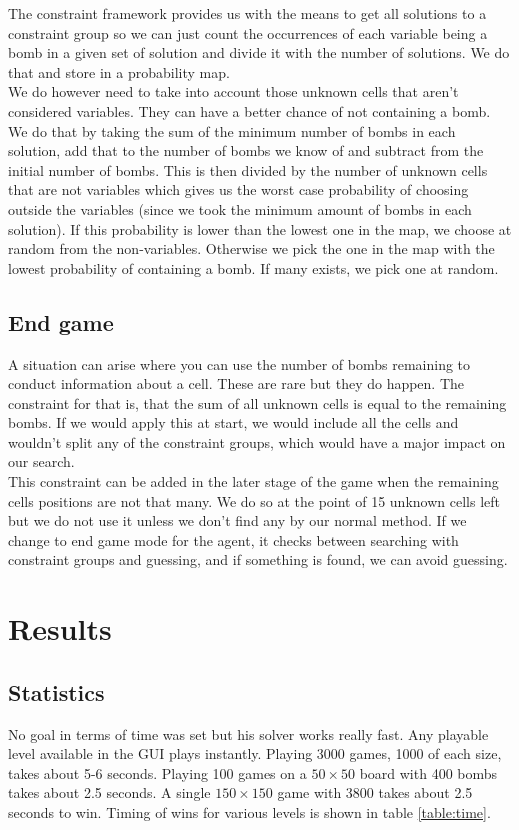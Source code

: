 \documentclass[11pt,a4paper,notitlepage]{article}
\theoremstyle{definition}
\begin{document}
The constraint framework provides us with the means to get all solutions to a constraint group so we can just count the occurrences of each variable being a bomb in a given set of solution and divide it with the number of solutions. We do that and store in a probability map.\\

We do however need to take into account those unknown cells that aren't considered variables. They can have a better chance of not containing a bomb. We do that by taking the sum of the minimum number of bombs in each solution, add that to the number of bombs we know of and subtract from the initial number of bombs. This is then divided by the number of unknown cells that are not variables which gives us the worst case probability of choosing outside the variables (since we took the minimum amount of bombs in each solution). If this probability is lower than the lowest one in the map, we choose at random from the non-variables. Otherwise we pick the one in the map with the lowest probability of containing a bomb. If many exists, we pick one at random.

\subsection{End game}
A situation can arise where you can use the number of bombs remaining to conduct information about a cell. These are rare but they do happen. The constraint for that is, that the sum of all unknown cells is equal to the remaining bombs. If we would apply this at start, we would include all the cells and wouldn't split any of the constraint groups, which would have a major impact on our search.\\

This constraint can be added in the later stage of the game when the remaining cells positions are not that many. We do so at the point of 15 unknown cells left but we do not use it unless we don't find any by our normal method. If we change to end game mode for the agent, it checks between searching with constraint groups and guessing, and if something is found, we can avoid guessing.

\section{Results}
\subsection{Statistics}
No goal in terms of time was set but his solver works really fast. Any playable level available in the GUI plays instantly. Playing 3000 games, 1000 of each size, takes about 5-6 seconds. Playing 100 games on a $50 \times 50$ board with 400 bombs takes about 2.5 seconds. A single $150 \times 150$ game with $3800$ takes about 2.5 seconds to win. Timing of wins for various levels is shown in table \ref{table:time}.
\end{document}
